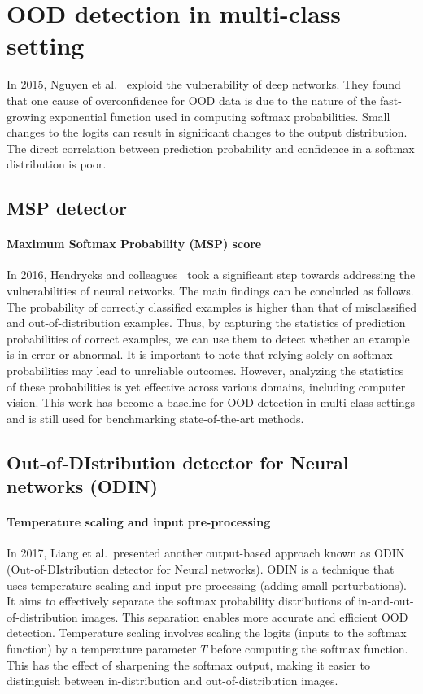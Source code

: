 \section{OOD detection in multi-class setting}
In 2015, Nguyen et al.~\cite{nguyenDeepNeuralNetworks2015} exploid the vulnerability of deep networks.
They found that one cause of overconfidence for OOD data is due to the nature of the fast-growing exponential function used in computing softmax probabilities.
Small changes to the logits can result in significant changes to the output distribution. The direct correlation between prediction probability and confidence in a softmax distribution is poor.

\subsection{MSP detector}
\paragraph{Maximum Softmax Probability (MSP) score}
In 2016, Hendrycks and colleagues~\cite{Hendrycks2016} took a significant step towards addressing the vulnerabilities of neural networks. The main findings can be concluded as follows. 
The probability of correctly classified examples is higher than that of misclassified and out-of-distribution examples. 
Thus, by capturing the statistics of prediction probabilities of correct examples, we can use them to detect whether an example is in error or abnormal. 
It is important to note that relying solely on softmax probabilities may lead to unreliable outcomes. 
However, analyzing the statistics of these probabilities is yet effective across various domains, including computer vision. 
This work has become a baseline for OOD detection in multi-class settings and is still used for benchmarking state-of-the-art methods.

\subsection{Out-of-DIstribution detector for Neural networks (ODIN)}
\paragraph{Temperature scaling and input pre-processing}
In 2017, Liang et al.~presented another output-based approach known as ODIN~\cite{Liang2017} 
(Out-of-DIstribution detector for Neural networks). 
ODIN is a technique that uses temperature scaling and input pre-processing (adding small perturbations). 
It aims to effectively separate the softmax probability distributions of in-and-out-of-distribution images. 
This separation enables more accurate and efficient OOD detection.
Temperature scaling involves scaling the logits (inputs to the softmax function) by a temperature parameter $T$ before computing the softmax function. 
This has the effect of sharpening the softmax output, making it easier to distinguish between in-distribution and out-of-distribution images.

